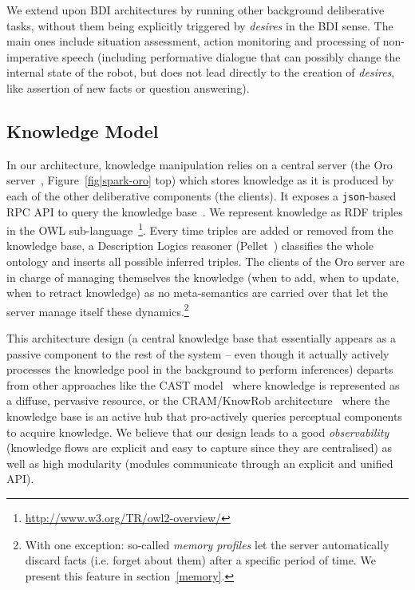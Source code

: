 \documentclass[preprint,3p,times]{elsarticle}
\newcommand{\ie}{i.e.\xspace}
\begin{document}
We extend upon BDI architectures by running other background deliberative tasks,
without them being explicitly triggered by \emph{desires} in the BDI sense.
The main ones include situation assessment, action monitoring and processing of
non-imperative speech (including performative dialogue that can possibly change
the internal state of the robot, but does not lead directly to the creation of
\emph{desires}, like assertion of new facts or question answering).

\subsection{Knowledge Model}

In our architecture, knowledge manipulation relies on a central server (the {\sc
Oro} server~\cite{Lemaignan2010}, Figure~\ref{fig|spark-oro} top) which stores
knowledge as it is produced by each of the other deliberative components (the
clients). It exposes a {\tt json}-based RPC API to query the knowledge
base~\cite{lemaignan2012kbapi}.  We represent knowledge as RDF triples in the
OWL sub-language~\footnote{\url{http://www.w3.org/TR/owl2-overview/}}. Every
time triples are added or removed from the knowledge base, a Description Logics
reasoner ({\sc Pellet}~\cite{sirin2007pellet})
classifies the whole ontology and inserts all possible inferred triples.  The
clients of the {\sc Oro} server are in charge of managing themselves the
knowledge (when to add, when to update, when to retract knowledge) as no
meta-semantics are carried over that let the server manage itself these
dynamics.\footnote{With one exception: so-called \emph{memory profiles} let the
server automatically discard facts (\ie forget about them) after a specific
period of time. We present this feature in section~\ref{memory}.}

This architecture design (a central knowledge base that essentially appears as a
passive component to the rest of the system -- even though it actually actively
processes the knowledge pool in the background to perform inferences)
departs from other approaches like the CAST model~\cite{Hawes2007} where
knowledge is represented as a diffuse, pervasive resource, or the CRAM/KnowRob
architecture~\cite{Beetz2010} where the knowledge base is an active hub that
pro-actively queries perceptual components to acquire knowledge. We believe that
our design leads to a good \emph{observability} (knowledge flows are explicit
and easy to capture since they are centralised) as well as high modularity
(modules communicate through an explicit and unified API).
\end{document}
